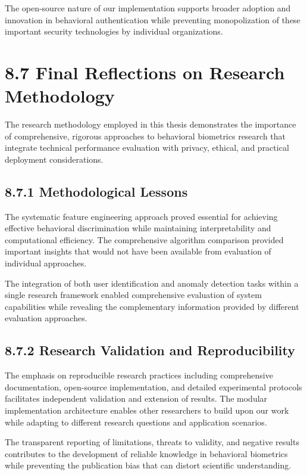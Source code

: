 \documentclass[
  12pt,
  a4paper,
]{report}
\begin{document}
The open-source nature of our implementation supports broader adoption
and innovation in behavioral authentication while preventing
monopolization of these important security technologies by individual
organizations.

\section{8.7 Final Reflections on Research
Methodology}\label{final-reflections-on-research-methodology}

The research methodology employed in this thesis demonstrates the
importance of comprehensive, rigorous approaches to behavioral
biometrics research that integrate technical performance evaluation with
privacy, ethical, and practical deployment considerations.

\subsection{8.7.1 Methodological Lessons}\label{methodological-lessons}

The systematic feature engineering approach proved essential for
achieving effective behavioral discrimination while maintaining
interpretability and computational efficiency. The comprehensive
algorithm comparison provided important insights that would not have
been available from evaluation of individual approaches.

The integration of both user identification and anomaly detection tasks
within a single research framework enabled comprehensive evaluation of
system capabilities while revealing the complementary information
provided by different evaluation approaches.

\subsection{8.7.2 Research Validation and
Reproducibility}\label{research-validation-and-reproducibility}

The emphasis on reproducible research practices including comprehensive
documentation, open-source implementation, and detailed experimental
protocols facilitates independent validation and extension of results.
The modular implementation architecture enables other researchers to
build upon our work while adapting to different research questions and
application scenarios.

The transparent reporting of limitations, threats to validity, and
negative results contributes to the development of reliable knowledge in
behavioral biometrics while preventing the publication bias that can
distort scientific understanding.
\end{document}

